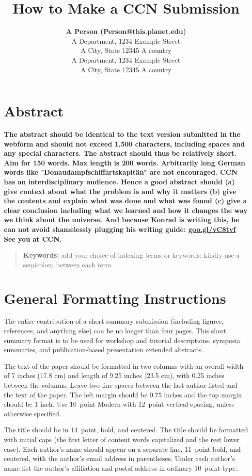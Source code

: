 \documentclass[10pt,letterpaper]{article}
\title{How to Make a CCN Submission}
\author{{\large \bf A Person (Person@this.planet.edu)} \\
  A Department, 1234 Example Street\\
A City, State 12345 A country
  \AND {\large \bf Another Person (AnotherPerson@this.planet.edu)} \\
  A Department, 1234 Example Street\\
A City, State 12345 A country}
\begin{document}
\maketitle


\section{Abstract}
{
\bf
The abstract should be identical to the text version submitted in the webform and should not exceed 1,500 characters, including spaces and any special characters. The abstract should thus be relatively short. Aim for 150 words.
Max length is 200 words. Arbitrarily long German words like "Donaudampfschiffartskapit\"an" are not encouraged.
CCN has an interdisciplinary audience. Hence a good abstract should
(a) give context about what the problem is and why it matters 
(b) give the contents and explain what was done and what was found
(c) give a clear conclusion including what we learned and how it changes 
the way we think about the universe.
And because Konrad is writing this, he can not avoid shamelessly plugging
his writing guide:
\url{goo.gl/vC8tvf} See you at CCN.
}
\begin{quote}
\small
\textbf{Keywords:} 
add your choice of indexing terms or keywords; kindly use a
semicolon; between each term
\end{quote}

\section{General Formatting Instructions}

The entire contribution of a short summary submission (including
figures, references, and anything else) can be no longer than four
pages. This short summary format is to be used for workshop and
tutorial descriptions, symposia summaries, and publication-based
presentation extended abstracts.

The text of the paper should be formatted in two columns with an
overall width of 7 inches (17.8 cm) and length of 9.25 inches (23.5
cm), with 0.25 inches between the columns. Leave two line spaces
between the last author listed and the text of the paper. The left
margin should be 0.75 inches and the top margin should be 1 inch.
Use 10~point Modern with 12~point vertical spacing, unless
otherwise specified.

The title should be in 14~point, bold, and centered. The title should
be formatted with initial caps (the first letter of content words
capitalized and the rest lower case). Each author's name should appear
on a separate line, 11~point bold, and centered, with the author's
email address in parentheses. Under each author's name list the
author's affiliation and postal address in ordinary 10~point type.
\end{document}
